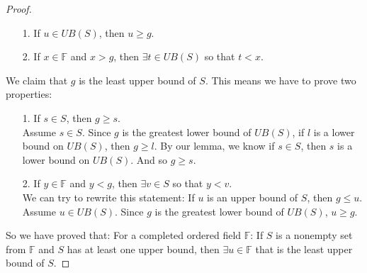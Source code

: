 \documentclass{article}
\theoremstyle{claim}
\theoremstyle{definition}
\begin{document}
\begin{enumerate}
\begin{proof}
            \begin{enumerate}
                \item[1.] If $u \in UB(S)$, then $u \ge g$.
                \item[2.] If $x \in \mathbb{F}$ and $x > g$, then $\exists t \in UB(S)$ so that $t < x$.
            \end{enumerate}
            We claim that $g$ is the least upper bound of $S$. This means we have to prove two properties:
            \begin{enumerate}
                \item[1.] If $s \in S$, then $g \ge s$.\\
                    Assume $s \in S$. Since $g$ is the greatest lower bound of $UB(S)$, if $l$ is a lower bound on $UB(S)$, then $g \ge l$. By our lemma, we know if $s \in S$, then $s$ is a lower bound on $UB(S)$. And so $g \ge s$. 
                \item[2.] If $y \in \mathbb{F}$ and $y < g$, then $\exists v \in S$ so that $y < v$.\\
                    We can try to rewrite this statement: If $u$ is an upper bound of $S$, then $g \le u$. Assume $u \in UB(S)$. Since $g$ is the greatest lower bound of $UB(S)$, $u \ge g$.
            \end{enumerate}
            So we have proved that: For a completed ordered field $\mathbb{F}$: If $S$ is a nonempty set from $\mathbb{F}$ and $S$ has at least one upper bound, then $\exists u \in \mathbb{F}$ that is the least upper bound of $S$.


\end{proof}
\end{enumerate}
\end{document}

